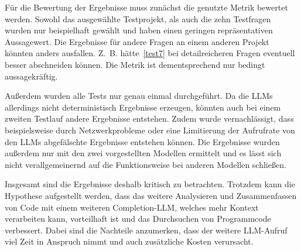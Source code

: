 \documentclass[../main.tex]{subfiles}
\begin{document}
Für die Bewertung der Ergebnisse muss zunächst die genutzte Metrik bewertet werden.
Sowohl das ausgewählte Testprojekt, als auch die zehn Testfragen wurden nur beispielhaft gewählt und haben einen geringen repräsentativen Aussagewert.
Die Ergebnisse für andere Fragen an einem anderen Projekt könnten anders ausfallen.
Z. B. hätte~\ref{test7} bei detailreicheren Fragen eventuell besser abschneiden können.
Die Metrik ist dementsprechend nur bedingt aussagekräftig.

Außerdem wurden alle Tests nur genau einmal durchgeführt. 
Da die \glspl{LLM} allerdings nicht deterministisch Ergebnisse erzeugen, könnten auch bei einem zweiten Testlauf andere Ergebnisse entstehen.
Zudem wurde vernachlässigt, dass beispielsweise durch Netzwerkprobleme oder eine Limitierung der Aufrufrate von den \glspl{LLM} abgefälschte Ergebnisse entstehen können.
Die Ergebnisse wurden außerdem nur mit den zwei vorgestellten Modellen ermittelt und es lässt sich nicht verallgemeinernd auf die Funktionsweise bei anderen Modellen schließen.

Insgesamt sind die Ergebnisse deshalb kritisch zu betrachten.
Trotzdem kann die Hypothese aufgestellt werden, dass das weitere Analysieren und Zusammenfassen von Code mit einem weiteren Completion-\gls{LLM}, welches mehr Kontext verarbeiten kann, vorteilhaft ist und das Durchsuchen von Programmcode verbessert.
Dabei sind die Nachteile anzumerken, dass der weitere \gls{LLM}-Aufruf viel Zeit in Anspruch nimmt und auch zusätzliche Kosten verursacht. 
\end{document}
